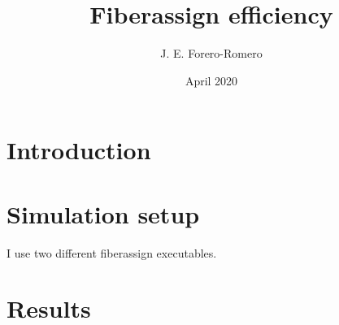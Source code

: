 \documentclass{article}
\title{Fiberassign efficiency}
\author{J. E. Forero-Romero}
\date{April 2020}
\begin{document}
\maketitle

\section{Introduction}

\section{Simulation setup}

I use two different fiberassign executables.


\section{Results}
\end{document}
